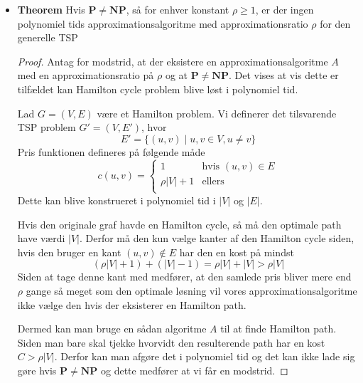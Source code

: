 \begin{itemize}
\begin{proof}
  \end{proof}
  \item \textbf{Theorem} Hvis $\mathbf{P} \neq \mathbf{NP}$, så for enhver konstant $\rho \geq 1$, er der ingen polynomiel tids approximationsalgoritme med approximationsratio $\rho$ for den generelle TSP 
  \begin{proof} 
    Antag for modstrid, at der eksistere en approximationsalgoritme $A$ med en approximationsratio på $\rho$ og at $\mathbf{P} \neq \mathbf{NP}$. Det vises at vis dette er tilfældet kan Hamilton cycle problem blive løst i polynomiel tid. \smallskip

    Lad $G=(V,E)$ være et Hamilton problem. Vi definerer det tilsvarende TSP problem $G'=(V, E')$, hvor 
    \begin{equation*}
      E' = \{(u,v) \mid u,v \in V, u \neq v \}
    \end{equation*}
    Pris funktionen defineres på følgende måde
    \begin{equation*}
    	c(u,v) =
    		\begin{cases}
    			\mbox{$1$} & \mbox{hvis $(u,v) \in E$} \\
    			\mbox{$\rho|V| + 1$} & \mbox{ellers} \\
    		\end{cases}
    \end{equation*}    
    Dette kan blive konstrueret i polynomiel tid i $|V|$ og $|E|$. \smallskip
    
    Hvis den originale graf havde en Hamilton cycle, så må den optimale path have værdi $|V|$. Derfor må den kun vælge kanter af den Hamilton cycle siden, hvis den bruger en kant $(u,v) \notin E$ har den en kost på mindst 
    \begin{equation*}
      (\rho |V| +1) + (|V| -1) = \rho |V| + |V| > \rho |V| 
    \end{equation*}
    Siden at tage denne kant med medfører, at den samlede pris bliver mere end $\rho$ gange så meget som den optimale løsning vil vores approximationsalgoritme ikke vælge den hvis der eksisterer en Hamilton path. \smallskip

    Dermed kan man bruge en sådan algoritme $A$ til at finde Hamilton path. Siden man bare skal tjekke hvorvidt den resulterende path har en kost $C > \rho |V|$. Derfor kan man afgøre det i polynomiel tid og det kan ikke lade sig gøre hvis $\mathbf{P} \neq \mathbf{NP}$ og dette medfører at vi får en modstrid. 

  \end{proof}
\end{itemize}


